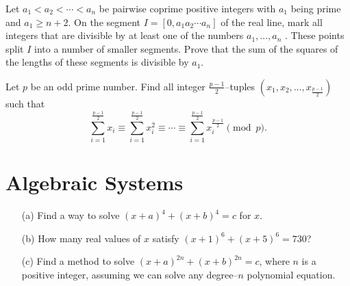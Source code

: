\documentclass[12pt,a4paper]{memoir}
\theoremstyle{definition}
\begin{document}
\begin{question}[name={2014 IMO Shortlist}]
	Let $a_1 < a_2 <  \cdots <a_n$ be pairwise coprime positive integers with $a_1$ being prime and $a_1 \ge n + 2$. On the segment $I = [0, a_1 a_2  \cdots a_n ]$ of the real line, mark all integers that are divisible by at least one of the numbers $a_1 ,   \ldots , a_n$ . These points split $I$ into a number of smaller segments. Prove that the sum of the squares of the lengths of these segments is divisible by $a_1$.
\end{question}

\begin{question}[name={2020 Iran TST}]
	Let $p$ be an odd prime number. Find all integer $\frac{p-1}2$--tuples $\left(x_1,x_2,\dots,x_{\frac{p-1}2}\right)$ such that
	$$\sum_{i = 1}^{\frac{p-1}{2}} x_{i} \equiv \sum_{i = 1}^{\frac{p-1}{2}} x_{i}^{2} \equiv \cdots \equiv \sum_{i = 1}^{\frac{p-1}{2}} x_{i}^{\frac{p - 1}{2}} \pmod p.$$
\end{question}

\newpage
% 
\section{Algebraic Systems}



\begin{tcolorbox}
	\begin{question}
		\begin{itemize}
			\item[(a)] Find a way to solve $(x+a)^4+(x+b)^4=c$ for $x$.
			\item[(b)] How many real values of $x$ satisfy $(x+1)^6+(x+5)^6=730$?
			\item[(c)] Find a method to solve $(x+a)^{2n} + (x+b)^{2n}=c$, where $n$ is a positive integer, assuming we can solve any degree--$n$ polynomial equation.
		\end{itemize}
	\end{question}
\end{tcolorbox}
\end{document}
